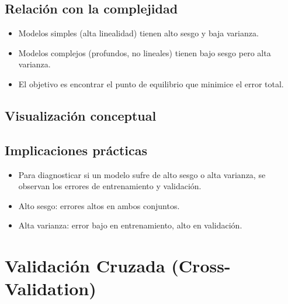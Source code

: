 \documentclass[12pt,a4paper,openany,oneside]{book}
\begin{document}
\subsection{Relación con la complejidad}
\begin{itemize}
    \item Modelos simples (alta linealidad) tienen alto sesgo y baja varianza.
    \item Modelos complejos (profundos, no lineales) tienen bajo sesgo pero alta varianza.
    \item El objetivo es encontrar el punto de equilibrio que minimice el error total.
\end{itemize}

\subsection{Visualización conceptual}
\begin{center}
\caption{Compromiso sesgo-varianza. El error total mínimo se alcanza en una complejidad intermedia.}
\end{center}

\subsection{Implicaciones prácticas}
\begin{itemize}
    \item Para diagnosticar si un modelo sufre de alto sesgo o alta varianza, se observan los errores de entrenamiento y validación.
    \item Alto sesgo: errores altos en ambos conjuntos.
    \item Alta varianza: error bajo en entrenamiento, alto en validación.
\end{itemize}

\section{Validación Cruzada (Cross-Validation)}
\end{document}
